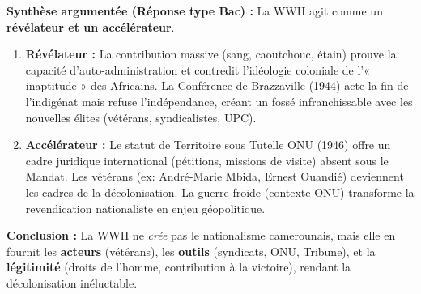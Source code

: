 \documentclass[11pt]{article}
\newcommand{\cle}[1]{{\popxbold\color{popdark}#1}}
\begin{document}
\begin{exoresolu}
\textbf{Synthèse argumentée (Réponse type Bac) :}
La WWII agit comme un \textbf{révélateur et un accélérateur}.
\begin{enumerate}
    \item \textbf{Révélateur :} La contribution massive (sang, caoutchouc, étain) prouve la capacité d'auto-administration et contredit l'idéologie coloniale de l'« inaptitude » des Africains. La Conférence de Brazzaville (1944) acte la fin de l'indigénat mais refuse l'indépendance, créant un fossé infranchissable avec les nouvelles élites (vétérans, syndicalistes, UPC).
    \item \textbf{Accélérateur :} Le statut de \cle{Territoire sous Tutelle ONU} (1946) offre un cadre juridique international (pétitions, missions de visite) absent sous le Mandat. Les vétérans (ex: \cle{André-Marie Mbida}, \cle{Ernest Ouandié}) deviennent les cadres de la décolonisation. La guerre froide (contexte ONU) transforme la revendication nationaliste en enjeu géopolitique.
\end{enumerate}
\textbf{Conclusion :} La WWII ne \textit{crée} pas le nationalisme camerounais, mais elle en fournit les \textbf{acteurs} (vétérans), les \textbf{outils} (syndicats, ONU, Tribune), et la \textbf{légitimité} (droits de l'homme, contribution à la victoire), rendant la décolonisation inéluctable.
\end{exoresolu}
\end{document}
